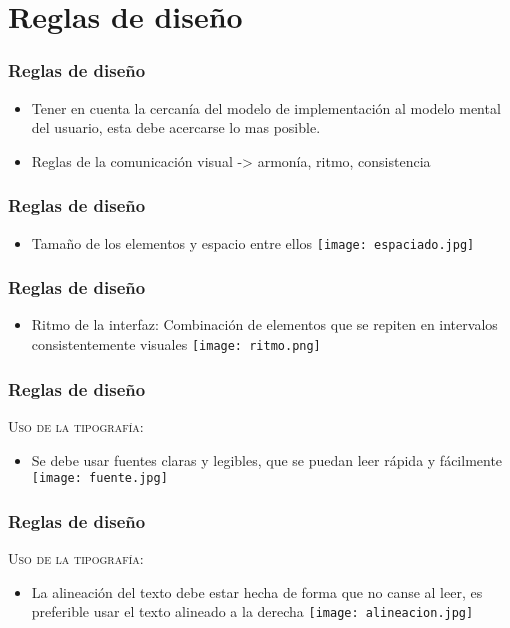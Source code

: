 \documentclass[11pt]{beamer}
\begin{document}
\section{Reglas de diseño}
\begin{frame}
\frametitle{Reglas de diseño}
\begin{itemize}
    \item{Tener en cuenta la cercanía del modelo de implementación al modelo mental del usuario, esta debe acercarse lo mas posible.}
    \item{Reglas de la comunicación visual -> armonía, ritmo, consistencia}
\end{itemize}
\end{frame}

\begin{frame}
\frametitle{Reglas de diseño}
\begin{itemize}
    \item{Tamaño de los elementos y espacio entre ellos}
    {\texttt{[image: espaciado.jpg]}}
\end{itemize}
\end{frame}

\begin{frame}
\frametitle{Reglas de diseño}
\begin{itemize}
    \item{Ritmo de la interfaz: Combinación de elementos que se repiten en intervalos consistentemente visuales}
    {\texttt{[image: ritmo.png]}}
\end{itemize}
\end{frame}

\begin{frame}
\frametitle{Reglas de diseño}
\begin{itemize}
    \textsc{Uso de la tipografía:}
\end{itemize}
\begin{itemize}
    \item{Se debe usar fuentes claras y legibles, que se puedan leer rápida y fácilmente}
    {\texttt{[image: fuente.jpg]}}
\end{itemize}
\end{frame}

\begin{frame}
\frametitle{Reglas de diseño}
\begin{itemize}
    \textsc{Uso de la tipografía:}
\end{itemize}
\begin{itemize}
    \item{La alineación del texto debe estar hecha de forma que no canse al leer, es preferible usar el texto alineado a la derecha}
    {\texttt{[image: alineacion.jpg]}}
\end{itemize}
\end{frame}
\end{document}
